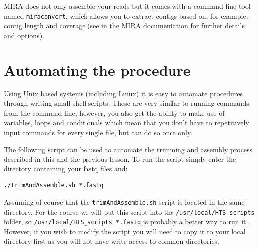 \documentclass[11pt]{article}
\begin{document}
MIRA does not only assemble your reads but it comes with a command
line tool named \texttt{miraconvert}, which allows you to extract contigs
based on, for example, contig length and coverage (see in the \href{http://mira-assembler.sourceforge.net/docs/DefinitiveGuideToMIRA.pdf}{MIRA
documentation} for further details and options).


\section{Automating the procedure}
\label{sec-3}
Using Unix based systems (including Linux) it is easy to automate procedures
through writing small shell scripts. These are very similar to running commands
from the command line; however, you also get the ability to make use of variables,
loops and conditionals which mean that you don't have to repetitively input commands
for every single file, but can do so once only.

The following script can be used to automate the trimming and assembly process
described in this and the previous lesson. To run the script simply enter the
directory containing your fastq files and:

\begin{verbatim}
./trimAndAssemble.sh *.fastq
\end{verbatim}

Assuming of course that the \texttt{trimAndAssemble.sh} script is located in the same directory.
For the course we will put this script into the \texttt{/usr/local/HTS\_scripts} folder, so
\texttt{/usr/local/HTS\_scripts *.fastq} is probably a better way to run it. However, if you
wish to modify the script you will need to copy it to your local directory first as
you will not have write access to common directories.
\end{document}
